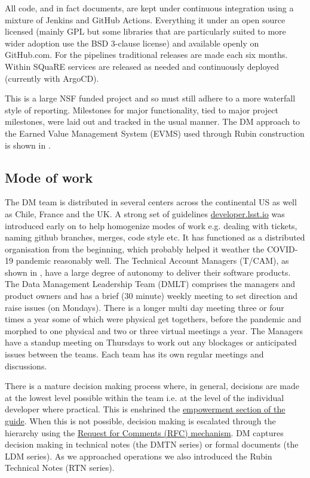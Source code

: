 All code, and in fact documents, are kept under continuous integration using a mixture of Jenkins and GitHub Actions.
Everything it under an open source licensed (mainly GPL but some libraries that are particularly suited to more wider adoption use the BSD 3-clause license) and available openly on GitHub.com.
For the pipelines traditional releases are made each six months.
Within SQuaRE services are released as needed and continuously deployed (currently with ArgoCD).

This is a large NSF funded project and so must still adhere to a more waterfall style of reporting.
Milestones for major functionality, tied to major project milestones, were laid out and tracked in the usual manner.
The DM approach to the Earned Value Management System (EVMS) used through Rubin construction is shown in \citet{DMTN-020,2016SPIE.9911E..0NK}.

\subsection{Mode of work}\label{sec:mode}
The DM  team is distributed in several centers across the continental US as well as Chile, France and the UK.
A strong set of guidelines \href{https:\\developer.lsst.io}{developer.lsst.io} was introduced early on to help homogenize modes of work e.g. dealing with tickets, naming github branches, merges, code style etc.
It has functioned as a distributed organisation from the beginning, which probably helped it weather the COVID-19 pandemic reasonably well.
The Technical Account Managers (T/CAM), as shown in , have a large degree of autonomy to deliver their software products.
The Data Management Leadership Team (DMLT) comprises the managers and product owners and has a brief (30 minute) weekly meeting to set direction and raise issues (on Mondays).
There is a longer multi day meeting three or four times a year some of which were physical get togethers, before the pandemic and morphed to one physical and two or three virtual meetings a year.
The Managers have a standup meeting on Thursdays to work out any blockages or anticipated issues between the teams.
Each team has its own regular meetings and discussions.

There is a mature decision making process where, in general, decisions are made at the lowest level possible within the team i.e. at the level of the individual developer where practical. This is enshrined the \href{https://developer.lsst.io/team/empowerment.html}{empowerment section of the guide}.
When this is not possible, decision making is escalated through the hierarchy using  the \href{https://developer.lsst.io/communications/rfc.html}{Request for Comments (RFC) mechanism}.
DM captures decision making in technical notes (the DMTN series) or formal documents (the LDM series).
As we approached operations we also introduced the Rubin Technical Notes (RTN series).


